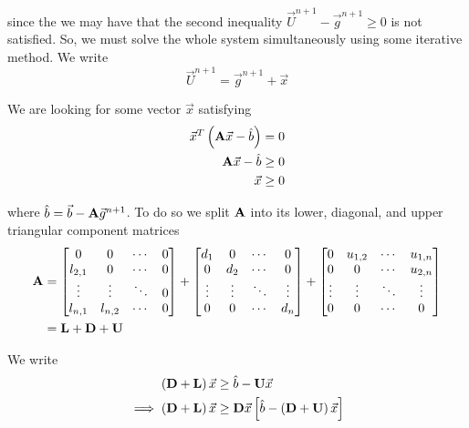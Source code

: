\documentclass[12pt]{article}
\begin{document}
since the we may have that the second inequality 	$\vec{U}^{n + 1} - \vec{g}^{n + 1} \geq 0$ is not satisfied. So, we must solve the whole system simultaneously using some iterative method. We write
\begin{equation*}
	\vec{U}^{n + 1} = \vec{g}^{n + 1} + \vec{x}
\end{equation*}

We are looking for some vector $\vec{x}$ satisfying
\begin{align*}
	\vec{x}^T\left( {\bf A}\vec{x} - \hat{b} \right) &= 0 \\
	{\bf A}\vec{x} - \hat{b} &\geq 0 \\
	\vec{x} &\geq 0
\end{align*}

where $\hat{b} = \vec{b} - {\bf A}\vec{g}^{n + 1}$. To do so we split ${\bf A}$ into its lower, diagonal, and upper triangular component matrices
\begin{align*}
	{\bf A} &=
	\begin{bmatrix}
	0 & 0 & \cdots & 0 \\
	l_{2,1} & 0 & \cdots & 0 \\
	\vdots & \vdots & \ddots & 0 \\
	l_{n,1} & l_{n,2} & \cdots & 0
	\end{bmatrix}		
	+
	\begin{bmatrix}
	d_1 & 0 & \cdots & 0 \\
	0 & d_2 & \cdots & 0 \\
	\vdots & \vdots & \ddots & \vdots \\
	0 & 0 & \cdots & d_n 
	\end{bmatrix}
	+
	\begin{bmatrix}
	0 & u_{1,2} & \cdots & u_{1,n} \\
	0 & 0 & \cdots & u_{2,n} \\
	\vdots & \vdots & \ddots & \vdots \\
	0 & 0 & \cdots & 0 \\
	\end{bmatrix} \\
	&= {\bf L} + {\bf D} + {\bf U}
\end{align*}

We write
\begin{align*}
	\left( {\bf D} + {\bf L} \right) \vec{x} &\geq \hat{b} - {\bf U}\vec{x} \\
	\implies \left( {\bf D} + {\bf L} \right) \vec{x} &\geq {\bf D}\vec{x} \left[ \hat{b} - \left({\bf D} + {\bf U}\right) \vec{x} \right]
\end{align*}
\end{document}
